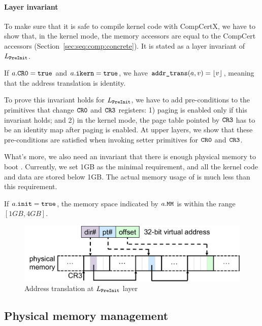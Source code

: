 \paragraph{Layer invariant}
To make sure that it is safe to compile
kernel code with CompCertX,
we have to show that, in the kernel mode,
the memory accessors are equal to the CompCert accessors
(\cf Section~\ref{sec:seq:comp:concrete}).
It is stated as a layer invariant of $L_{\texttt{PreInit}}$.
\begin{invariant}
If $a.{\texttt{CR0}} = {\texttt{true}}$
and $a.{\texttt{ikern}} = {\texttt{true}}$,
we have ${\texttt{addr\_trans}}(a,v) = \left\lfloor {v} \right\rfloor$,
 meaning that the address translation is identity.
\end{invariant}

To prove this invariant holds for $L_{\texttt{PreInit}}$,
we have to add pre-conditions
to the primitives that change ${\texttt{CR0}}$ and ${\texttt{CR3}}$
registers:
1) paging is enabled only if this invariant
holds;
and 2) in the kernel mode,
the page table pointed by ${\texttt{CR3}}$
has to be an identity map
after paging is enabled.
At upper layers,
we  show that
these pre-conditions
are satisfied
when invoking setter primitives for ${\texttt{CR0}}$ and ${\texttt{CR3}}$.

What's more,
we also need an invariant that there is enough
physical memory to boot \mCTOS{}.
Currently, we set 1GB as the minimal requirement,
and all the kernel code and data are stored below
1GB. The actual memory usage of \mCTOS{}
is much less than this requirement.
\begin{invariant}
If $a.{\texttt{init}} = {\texttt{true}}$,
the memory space indicated by $a.{\texttt{MM}}$
is within the range
$[1GB, 4GB]$.
\end{invariant}

\begin{figure}[t]\centering
\includegraphics[scale=.55]{figs/mem_model_1} 
\caption{Address translation at $L_{\texttt{PreInit}}$ layer}
\label{fig:seq:mem1}
\hrulefill
\end{figure}




\subsection{Physical memory management}
\label{sec:base:pmm} 

